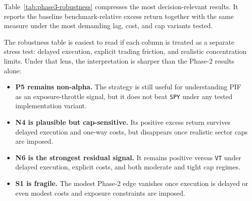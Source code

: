 \documentclass[conference]{IEEEtran}
\begin{document}
Table~\ref{tab:phase3-robustness} compresses the most decision-relevant results. It reports the baseline benchmark-relative excess return together with the same measure under the most demanding lag, cost, and cap variants tested.

\begin{table}[!t]
\caption{Phase-3 Robustness Summary for the Focus Set}
\label{tab:phase3-robustness}
\centering
\small
\setlength{\tabcolsep}{4pt}
\end{table}

The robustness table is easiest to read if each column is treated as a separate stress test: delayed execution, explicit trading friction, and realistic concentration limits. Under that lens, the interpretation is sharper than the Phase-2 results alone:
\begin{itemize}[leftmargin=1.4em]
    \item \textbf{P5 remains non-alpha.} The strategy is still useful for understanding PIF as an exposure-throttle signal, but it does not beat \texttt{SPY} under any tested implementation variant.
    \item \textbf{N4 is plausible but cap-sensitive.} Its positive excess return survives delayed execution and one-way costs, but disappears once realistic sector caps are imposed.
    \item \textbf{N6 is the strongest residual signal.} It remains positive versus \texttt{VT} under delayed execution, explicit costs, and both moderate and tight cap regimes.
    \item \textbf{S1 is fragile.} The modest Phase-2 edge vanishes once execution is delayed or even modest costs and exposure constraints are imposed.
\end{itemize}
\end{document}
